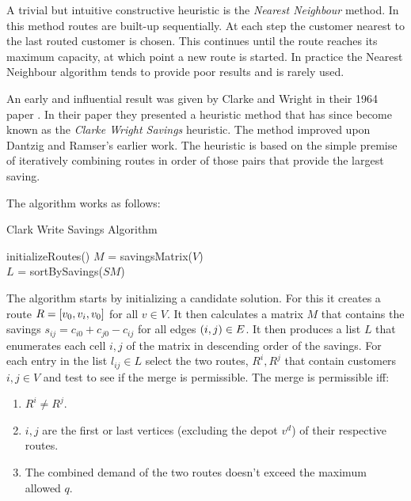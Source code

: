 A trivial but intuitive constructive heuristic is the \emph{Nearest Neighbour} method. In this method routes are built-up sequentially. At each step the customer nearest to the last routed customer is chosen. This continues until the route reaches its maximum capacity, at which point a new route is started. In practice the Nearest Neighbour algorithm tends to provide poor results and is rarely used. 
 

An early and influential result was given by Clarke and Wright in their 1964 paper \cite{clark:1964}. In their paper they presented a heuristic method that has since become known as the \emph{Clarke Wright Savings} heuristic. The method improved upon Dantzig and Ramser's earlier work. The heuristic is based on the simple premise of iteratively combining routes in order of those pairs that provide the largest saving. 


The algorithm works as follows:

\begin{algorithm}[H]
   \caption{Clark Write Savings Algorithm}
   initializeRoutes()
   $M$ = savingsMatrix($V$)\\
   $L$ = sortBySavings($SM$)
\end{algorithm}

The algorithm starts by initializing a candidate solution. For this it creates a route $R = [v_0, v_i, v_0]$ for all $v \in V$. It then calculates a matrix $M$ that contains the savings $s_{ij} = c_{i0} + c_{j0} - c_{ij}$ for all edges $(i,j) \in E$. It then produces a list $L$ that enumerates each cell $i,j$ of the matrix in descending order of the savings. For each entry in the list $l_{ij} \in L$ select the two routes, $R^i, R^j$ that contain customers $i, j \in V$ and test to see if the merge is permissible. The merge is permissible iff:

\begin{enumerate}
   \item $R^i \neq R^j$.
   \item $i,j$ are the first or last vertices (excluding the depot $v^d$) of their respective routes.
   \item The combined demand of the two routes doesn't exceed the maximum allowed $q$.
\end{enumerate}

